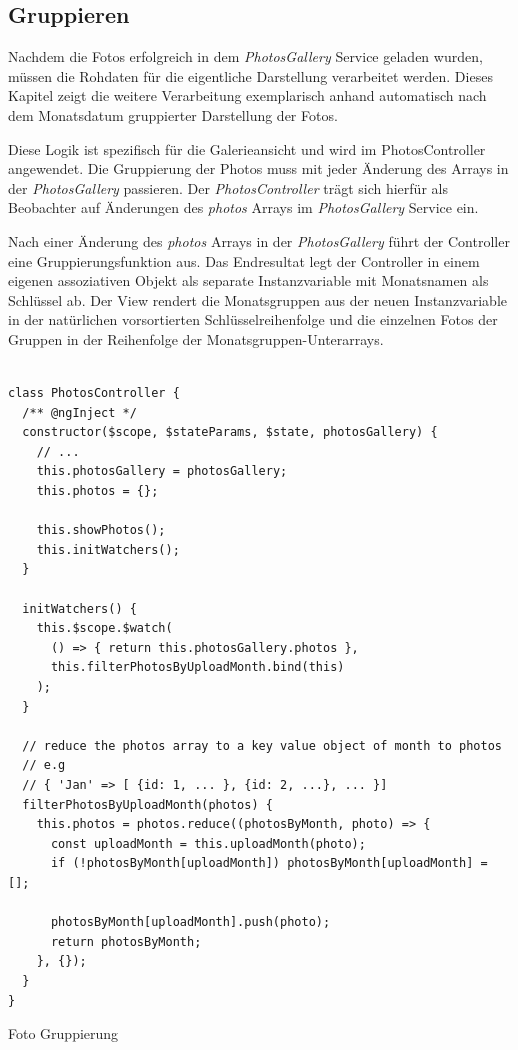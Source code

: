 \subsection{Gruppieren}

Nachdem die Fotos erfolgreich in dem \textit{PhotosGallery} Service geladen wurden, müssen die Rohdaten für die eigentliche Darstellung verarbeitet werden. Dieses Kapitel zeigt die weitere Verarbeitung exemplarisch anhand automatisch nach dem Monatsdatum gruppierter Darstellung der Fotos.

Diese Logik ist spezifisch für die Galerieansicht und wird im PhotosController angewendet. Die Gruppierung der Photos muss mit jeder Änderung des Arrays in der \textit{PhotosGallery} passieren. Der \textit{PhotosController} trägt sich hierfür als Beobachter auf Änderungen des \textit{photos} Arrays im \textit{PhotosGallery} Service ein.

Nach einer Änderung des \textit{photos} Arrays in der \textit{PhotosGallery} führt der Controller eine Gruppierungsfunktion aus. Das Endresultat legt der Controller in einem eigenen assoziativen Objekt als separate Instanzvariable mit Monatsnamen als Schlüssel ab. Der View rendert die Monatsgruppen aus der neuen Instanzvariable in der natürlichen vorsortierten Schlüsselreihenfolge und die einzelnen Fotos der Gruppen in der Reihenfolge der Monatsgruppen-Unterarrays.

\begin{listing}[H]
\begin{verbatim}

class PhotosController {
  /** @ngInject */
  constructor($scope, $stateParams, $state, photosGallery) {
    // ...
    this.photosGallery = photosGallery;
    this.photos = {};

    this.showPhotos();
    this.initWatchers();
  }

  initWatchers() {
    this.$scope.$watch(
      () => { return this.photosGallery.photos },
      this.filterPhotosByUploadMonth.bind(this)
    );
  }

  // reduce the photos array to a key value object of month to photos
  // e.g
  // { 'Jan' => [ {id: 1, ... }, {id: 2, ...}, ... }]
  filterPhotosByUploadMonth(photos) {
    this.photos = photos.reduce((photosByMonth, photo) => {
      const uploadMonth = this.uploadMonth(photo);
      if (!photosByMonth[uploadMonth]) photosByMonth[uploadMonth] = [];

      photosByMonth[uploadMonth].push(photo);
      return photosByMonth;
    }, {});
  }
}

\end{verbatim}
\caption{Foto Gruppierung}
\label{lst:photo_group}
\end{listing}

